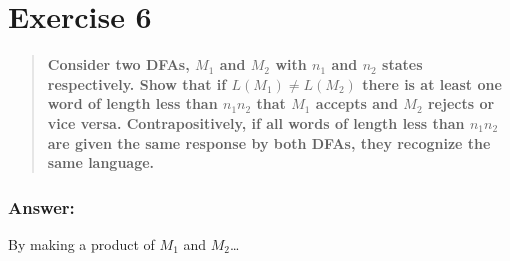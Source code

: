 \documentclass[titlepage]{article}\usepackage[]{graphicx}\usepackage[]{color}
\begin{document}
\section{Exercise 6}
\begin{quote}
  \textbf{Consider two DFAs, $M_1$ and $M_2$ with $n_1$ and $n_2$ states
  respectively. Show that if $L(M_1) \neq L(M_2)$ there is at least one word of
length less than $n_1n_2$ that $M_1$ accepts and $M_2$ rejects or vice versa.
Contrapositively, if all words of length less than $n_1n_2$ are given the same
response by both DFAs, they recognize the same language.}
\end{quote}
\subsubsection{Answer:}
  By making a product of $M_1$ and $M_2$\dots
\end{document}
